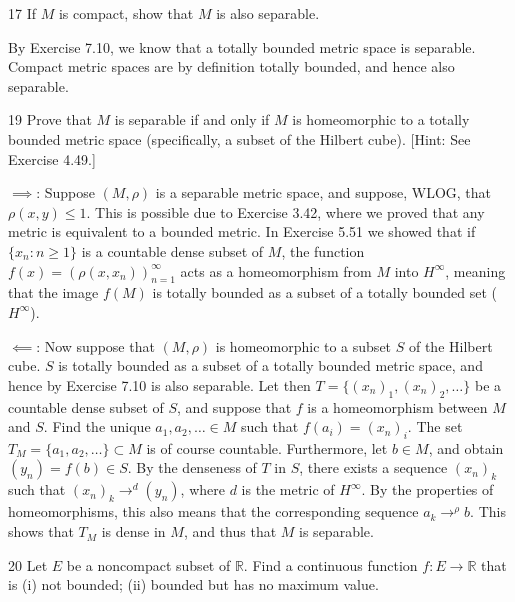 \begin{exercise}{17}
    If $M$ is compact, show that $M$ is also separable.
\end{exercise}

\begin{solution}
    
    By Exercise 7.10, we know that a totally bounded metric space is separable.
    Compact metric spaces are by definition totally bounded, and hence also separable.
\end{solution}

\begin{exercise}{19}
    Prove that $M$ is separable if and only if $M$ is homeomorphic to a totally bounded metric space (specifically, a subset of the Hilbert cube).
    [Hint: See Exercise 4.49.]
\end{exercise}

\begin{solution}
    
    $\implies$: Suppose $(M, \rho)$ is a separable metric space, and suppose, WLOG, that $\rho(x, y) \leq 1$.
    This is possible due to Exercise 3.42, where we proved that any metric is equivalent to a bounded metric.
    In Exercise 5.51 we showed that if $\{x_n: n \geq 1\}$ is a countable dense subset of $M$, the function $f(x) = (\rho(x, x_n))_{n=1}^{\infty}$ acts as a homeomorphism from $M$ into $H^{\infty}$, meaning that the image $f(M)$ is totally bounded as a subset of a totally bounded set ($H^{\infty}$).

    $\impliedby$: Now suppose that $(M, \rho)$ is homeomorphic to a subset $S$ of the Hilbert cube.
    $S$ is totally bounded as a subset of a totally bounded metric space, and hence by Exercise 7.10 is also separable.
    Let then $T = \{(x_n)_1, (x_n)_2, \ldots\}$ be a countable dense subset of $S$, and suppose that $f$ is a homeomorphism between $M$ and $S$.
    Find the unique $a_1, a_2, \ldots \in M$ such that $f(a_i) = (x_n)_i$.
    The set $T_M = \{a_1, a_2, \ldots\} \subset M$ is of course countable.
    Furthermore, let $b \in M$, and obtain $(y_n) = f(b) \in S$.
    By the denseness of $T$ in $S$, there exists a sequence $(x_n)_k$ such that $(x_n)_k \rightarrow^{d} (y_n)$, where $d$ is the metric of $H^{\infty}$.
    By the properties of homeomorphisms, this also means that the corresponding sequence $a_k \rightarrow^{\rho} b$.
    This shows that $T_M$ is dense in $M$, and thus that $M$ is separable.
\end{solution}

\begin{exercise}{20}
    Let $E$ be a noncompact subset of $\mathbb{R}$.
    Find a continuous function $f: E \rightarrow \mathbb{R}$ that is (i) not bounded; (ii) bounded but has no maximum value.
\end{exercise}


